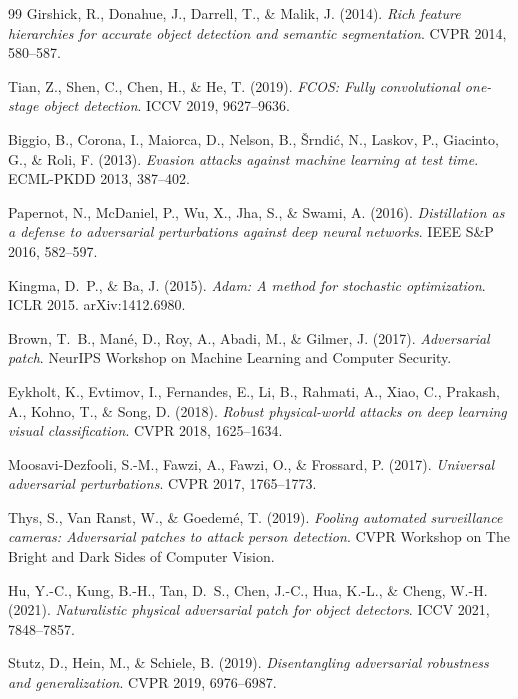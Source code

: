 \documentclass[12pt,a4paper]{report}
\begin{document}
\begin{thebibliography}{99}
Girshick, R., Donahue, J., Darrell, T., \& Malik, J. (2014).
\textit{Rich feature hierarchies for accurate object detection and semantic segmentation}.
CVPR 2014, 580--587.

Tian, Z., Shen, C., Chen, H., \& He, T. (2019).
\textit{FCOS: Fully convolutional one-stage object detection}.
ICCV 2019, 9627--9636.

Biggio, B., Corona, I., Maiorca, D., Nelson, B., \v{S}rndi\'{c}, N., Laskov, P., Giacinto, G., \& Roli, F. (2013).
\textit{Evasion attacks against machine learning at test time}.
ECML-PKDD 2013, 387--402.

Papernot, N., McDaniel, P., Wu, X., Jha, S., \& Swami, A. (2016).
\textit{Distillation as a defense to adversarial perturbations against deep neural networks}.
IEEE S\&P 2016, 582--597.

Kingma, D.~P., \& Ba, J. (2015).
\textit{Adam: A method for stochastic optimization}.
ICLR 2015. arXiv:1412.6980.

Brown, T.~B., Man\'{e}, D., Roy, A., Abadi, M., \& Gilmer, J. (2017).
\textit{Adversarial patch}.
NeurIPS Workshop on Machine Learning and Computer Security.

Eykholt, K., Evtimov, I., Fernandes, E., Li, B., Rahmati, A., Xiao, C., Prakash, A., Kohno, T., \& Song, D. (2018).
\textit{Robust physical-world attacks on deep learning visual classification}.
CVPR 2018, 1625--1634.

Moosavi-Dezfooli, S.-M., Fawzi, A., Fawzi, O., \& Frossard, P. (2017).
\textit{Universal adversarial perturbations}.
CVPR 2017, 1765--1773.

Thys, S., Van Ranst, W., \& Goedem\'{e}, T. (2019).
\textit{Fooling automated surveillance cameras: Adversarial patches to attack person detection}.
CVPR Workshop on The Bright and Dark Sides of Computer Vision.

Hu, Y.-C., Kung, B.-H., Tan, D.~S., Chen, J.-C., Hua, K.-L., \& Cheng, W.-H. (2021).
\textit{Naturalistic physical adversarial patch for object detectors}.
ICCV 2021, 7848--7857.

Stutz, D., Hein, M., \& Schiele, B. (2019).
\textit{Disentangling adversarial robustness and generalization}.
CVPR 2019, 6976--6987.


\end{thebibliography}
\end{document}
